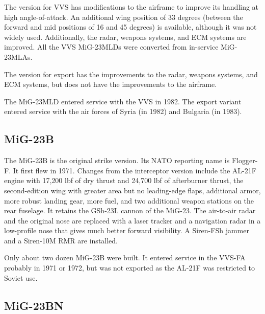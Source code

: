 The version for VVS has modifications to the airframe to improve its handling at high angle-of-attack. An additional wing position of 33 degrees (between the forward and mid positions of 16 and 45 degrees) is available, although it was not widely used. Additionally, the radar, weapons systems, and ECM systems are improved. All the VVS MiG-23MLDs were converted from in-service MiG-23MLAs.

The version for export has the improvements to the radar, weapons systems, and ECM systems, but does not have the improvements to the airframe.

The MiG-23MLD entered service with the VVS in 1982. The export variant entered service with the air forces of Syria (in 1982) and Bulgaria (in 1983).

\subsection{MiG-23B}

The MiG-23B is the original strike version. Its NATO reporting name is Flogger-F.
It first flew in 1971.
Changes from the interceptor version include the AL-21F engine with 17,200 lbf of dry thrust and 24,700 lbf of afterburner thrust, the second-edition wing with greater area but no leading-edge flaps, additional armor, more robust landing gear, more fuel, and two additional weapon stations on the rear fuselage.
It retains the GSh-23L cannon of the MiG-23.
The air-to-air radar and the original nose are replaced with a laser tracker and a navigation radar in a low-profile nose that gives much better forward visibility.
A Siren-FSh jammer and a Siren-10M RMR are installed.%

Only about two dozen MiG-23B were built.
It entered service in the VVS-FA probably in 1971 or 1972, but was not exported as the AL-21F was restricted to Soviet use.%

\subsection{MiG-23BN}

